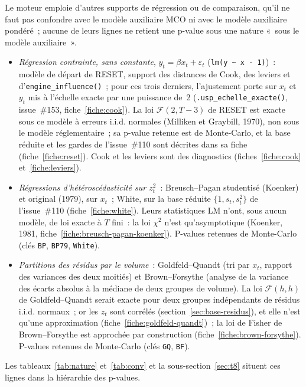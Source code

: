 \documentclass[a4paper,11pt]{article}
\newcommand{\code}[1]{\texttt{\small #1}}
\begin{document}
Le moteur emploie d'autres supports de régression ou de comparaison, qu'il ne faut pas confondre
avec le modèle auxiliaire MCO ni avec le modèle auxiliaire pondéré~; aucune de leurs lignes ne
retient une p-value sous une nature «~sous le modèle auxiliaire~».
\begin{itemize}[itemsep=1pt]
  \item \emph{Régression contrainte, sans constante}, $y_t = \beta x_t + \varepsilon_t$
  (\code{lm(y \textasciitilde\ x - 1)})~: modèle de départ de RESET, support des distances de Cook,
  des leviers et d'\code{engine\_influence()}~; pour ces trois derniers, l'ajustement porte sur
  $x_t$ et $y_t$ mis à l'échelle exacte par une puissance de~2 (\code{.usp\_echelle\_exacte()},
  issue~\#153, fiche~\ref{fiche:cook}). La loi $\mathcal{F}(2, T-3)$ de RESET est exacte
  sous ce modèle à erreurs i.i.d. normales (Milliken et Graybill, 1970), non sous le modèle
  réglementaire~; sa p-value retenue est de Monte-Carlo, et la base réduite et les gardes de
  l'issue~\#110 sont décrites dans sa fiche (fiche~\ref{fiche:reset}). Cook et les leviers sont des
  diagnostics (fiches~\ref{fiche:cook} et~\ref{fiche:leviers}).
  \item \emph{Régressions d'hétéroscédasticité sur $z_t^2$}~: Breusch--Pagan studentisé (Koenker)
  et original (1979), sur $x_t$~; White, sur la base réduite $\{1, s_t, s_t^2\}$ de
  l'issue~\#110 (fiche~\ref{fiche:white}). Leurs statistiques $\mathrm{LM}$ n'ont, sous aucun
  modèle, de loi exacte à $T$ fini~: la loi $\chi^2$ n'est qu'asymptotique (Koenker, 1981,
  fiche~\ref{fiche:breusch-pagan-koenker}). P-values retenues de Monte-Carlo (clés \code{BP},
  \code{BP79}, \code{White}).
  \item \emph{Partitions des résidus par le volume}~: Goldfeld--Quandt (tri par $x_t$, rapport des
  variances des deux moitiés) et Brown--Forsythe (analyse de la variance des écarts absolus à la
  médiane de deux groupes de volume). La loi $\mathcal{F}(h, h)$ de Goldfeld--Quandt serait exacte
  pour deux groupes indépendants de résidus i.i.d. normaux~; or les $z_t$ sont corrélés
  (section~\ref{sec:base-residus}), et elle n'est qu'une approximation
  (fiche~\ref{fiche:goldfeld-quandt})~; la loi de Fisher de Brown--Forsythe est approchée par
  construction (fiche~\ref{fiche:brown-forsythe}). P-values retenues de Monte-Carlo (clés
  \code{GQ}, \code{BF}).
\end{itemize}
Les tableaux~\ref{tab:nature} et~\ref{tab:conv} et la sous-section~\ref{sec:t8} situent ces lignes
dans la hiérarchie des p-values.
\end{document}
